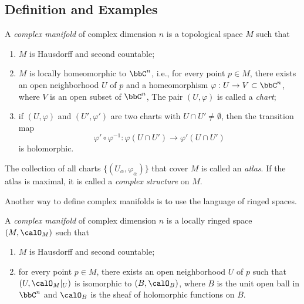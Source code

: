 \subsection{Definition and Examples}

    \begin{definition}\label{def:complex_manifold}
        A \emph{complex manifold} of complex dimension \(n\) is a topological space \(M\) such that
        \begin{enumerate}
            \item \(M\) is Hausdorff and second countable;
            \item \(M\) is locally homeomorphic to \(\bbC^n\), i.e., for every point \(p\in M\), there exists an open neighborhood \(U\) of \(p\) and a homeomorphism \(\varphi: U\to V\subset \bbC^n\), where \(V\) is an open subset of \(\bbC^n\),
                The pair \((U,\varphi)\) is called a \emph{chart};
            \item if \((U,\varphi)\) and \((U',\varphi')\) are two charts with \(U\cap U'\neq \emptyset\), then the transition map
                \[
                    \varphi'\circ \varphi^{-1}: \varphi(U\cap U')\to \varphi'(U\cap U')
                \]
                is holomorphic.
        \end{enumerate}
        The collection of all charts \(\{(U_\alpha,\varphi_\alpha)\}\) that cover \(M\) is called an \emph{atlas}.
        If the atlas is maximal, it is called a \emph{complex structure} on \(M\).
    \end{definition}

    Another way to define complex manifolds is to use the language of ringed spaces.

    \begin{definition}\label{def:complex_manifold_as_ringed_space}
        A \emph{complex manifold} of complex dimension \(n\) is a locally ringed space \((M,\calO_M)\) such that
        \begin{enumerate}
            \item \(M\) is Hausdorff and second countable;
            \item for every point \(p\in M\), there exists an open neighborhood \(U\) of \(p\) such that \((U,\calO_M|_U)\) is isomorphic to \((B,\calO_B)\), where \(B\) is the unit open ball in \(\bbC^n\) and \(\calO_B\) is the sheaf of holomorphic functions on \(B\).
        \end{enumerate}
    \end{definition}

